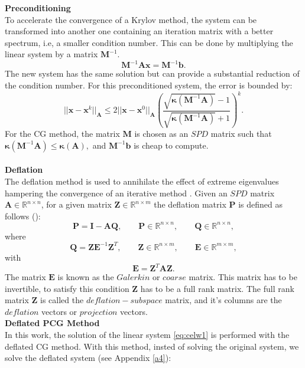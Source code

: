 \documentclass[12pt]{article}
\begin{document}
\textbf{Preconditioning}\\
To accelerate the convergence of a Krylov method,  the system can be transformed into
another one containing an iteration matrix with a better spectrum, i.e, a smaller condition number. 
This can be done by multiplying the linear system by a matrix $\mathbf{M}^{-1}.$
\begin{equation}\label{eq:precon}
 \mathbf{M}^{-1}\mathbf{A}\mathbf{x}=\mathbf{M}^{-1}\mathbf{b}.
\end{equation}
The new system has the same solution but can provide a substantial reduction of the condition number. 
For this preconditioned system, the error is bounded by:
\begin{equation}\label{eq:convp}
 ||\mathbf{x}-\mathbf{x}^{k}||_\mathbf{A}\leq 2||\mathbf{x}-\mathbf{x}^{0}||_\mathbf{A} 
 \left( \frac{\sqrt{\mathbf{\kappa}(\mathbf{M}^{-1}\mathbf{A})}-1}{\sqrt{\mathbf{\kappa}(\mathbf{M}^{-1}\mathbf{A})}+1} \right)^{k}.
\end{equation}
For the CG method, the matrix $\mathbf{M}$ is chosen as an $SPD$ matrix such that $\mathbf{\kappa}(\mathbf{M}^{-1}\mathbf{A})\leq \mathbf{\kappa}(\mathbf{A}),$ and $\mathbf{M}^{-1}\mathbf{b}$ is cheap to compute.\\\\
\textbf{Deflation}\\
The deflation method is used to annihilate the effect of extreme eigenvalues hampering the convergence of an iterative method \cite{Vuik99}. 
Given an $SPD$ matrix $\mathbf{A} \in \mathbb{R}^{n \times n}$, for a given matrix $\mathbf{Z}\in \mathbb{R}^{n\times m}$ the deflation matrix $\mathbf{P}$ is defined as follows (\cite{Tang08,Tang09}):
$$\mathbf{P}=\mathbf{I}-\mathbf{A}\mathbf{Q}, \qquad \mathbf{P} \in \mathbb{R}^{n \times n}, \qquad \mathbf{Q} \in \mathbb{R}^{n \times n},$$
where
$$\mathbf{Q}=\mathbf{Z}\mathbf{E}^{-1}\mathbf{Z}^T, \qquad \mathbf{Z} \in \mathbb{R}^{n \times m}, \qquad \mathbf{E} \in \mathbb{R}^{m \times m}, $$
with
$$\mathbf{E}=\mathbf{Z}^T\mathbf{A}\mathbf{Z}.$$
The matrix $\mathbf{E}$ is known as the $Galerkin$ or $coarse$ matrix. This matrix has to be invertible, to satisfy this condition $\mathbf{Z}$ has to be a full rank matrix.
The full rank matrix $\mathbf{Z}$ is called the $deflation-subspace$ matrix, 
and it's columns are the
$deflation$ vectors or $projection$ vectors.\\
\textbf{Deflated PCG Method}\\
\hspace{0.5cm}
In this work, the solution of the linear system \eqref{eq:celw1} is performed with the deflated CG method. With this method, insted of solving the original system, we  solve the deflated system (see Appendix \ref{a4}):
\end{document}
